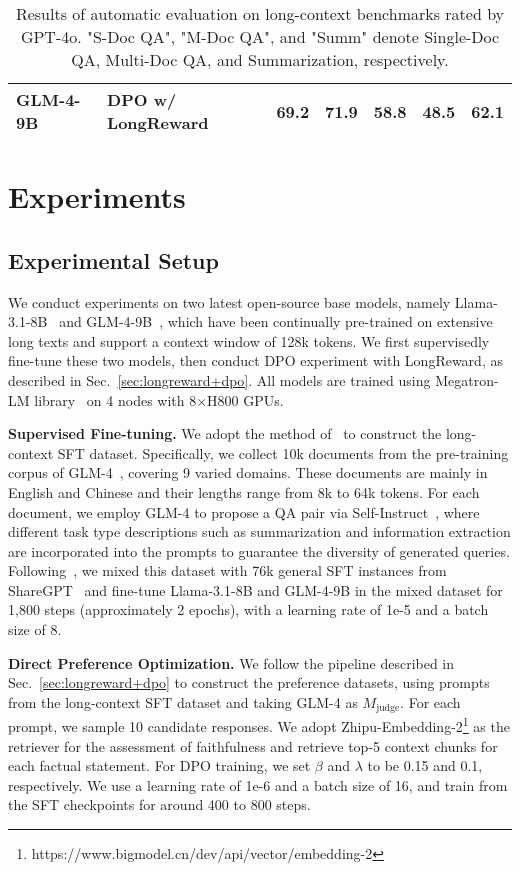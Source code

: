 \begin{table*}[t]
{\begin{tabular}{llccccc}
\multirow{-5}{*}{GLM-4-9B}     & DPO w/ LongReward                              & \textbf{69.2}                    & \textbf{71.9}               & \textbf{58.8}               & \textbf{48.5}               & \textbf{62.1}      \\ \bottomrule        
\end{tabular}
}
\caption{Results of automatic evaluation on long-context benchmarks rated by GPT-4o. "S-Doc QA", "M-Doc QA", and "Summ" denote Single-Doc QA, Multi-Doc QA, and Summarization, respectively.}
\label{tab:main_long}
\end{table*}\section{Experiments}

\subsection{Experimental Setup}
We conduct experiments on two latest open-source base models, namely Llama-3.1-8B~\cite{llama-3-1} and GLM-4-9B~\cite{glm4}, which have been continually pre-trained on extensive long texts and support a context window of 128k tokens. We first supervisedly fine-tune these two models, then conduct DPO experiment with LongReward, as described in Sec.~\ref{sec:longreward+dpo}. All models are trained using Megatron-LM library~\cite{megatron-lm} on 4 nodes with 8$\times$H800 GPUs. 

\noindent\textbf{Supervised Fine-tuning.} We adopt the method of~\citet{longalign} to construct the long-context SFT dataset. Specifically, we collect 10k documents from the pre-training corpus of GLM-4~\cite{glm4}, covering 9 varied domains. These documents are mainly in English and Chinese and their lengths range from  8k to 64k tokens. For each document, we employ GLM-4 to propose a QA pair via Self-Instruct~\cite{self-instruct}, where different task type descriptions such as summarization and information extraction are incorporated into the prompts to guarantee the diversity of generated queries. Following~\citet{longalign}, we mixed this dataset with 76k general SFT instances from ShareGPT~\cite{vicuna2023} and fine-tune Llama-3.1-8B and GLM-4-9B in the mixed dataset for 1,800 steps (approximately 2 epochs), with a learning rate of 1e-5 and a batch size of 8.

\noindent\textbf{Direct Preference Optimization.} We follow the pipeline described in Sec.~\ref{sec:longreward+dpo} to construct the preference datasets, using prompts from the long-context SFT dataset and taking GLM-4 as $M_\text{judge}$. For each prompt, we sample 10 candidate responses. We adopt Zhipu-Embedding-2\footnote{https://www.bigmodel.cn/dev/api/vector/embedding-2} as the retriever for the assessment of faithfulness and retrieve top-5 context chunks for each factual statement. For DPO training, we set $\beta$ and $\lambda$ to be 0.15 and 0.1, respectively. We use a learning rate of 1e-6 and a batch size of 16, and train from the SFT checkpoints for around 400 to 800 steps. 

